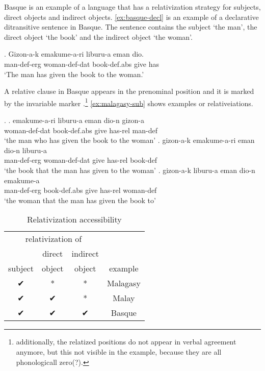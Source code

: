 Basque is an example of a language that has a relativization strategy for subjects, direct objects and indirect objects. \ref{ex:basque-decl} is an example of a declarative ditransitive sentence in Basque. The sentence contains the subject  `the man', the direct object  `the book' and the indirect object  `the woman'.

\exg. Gizon-a-k emakume-a-ri liburu-a eman dio.\\
 man-\ac{def}-\ac{erg} woman-\ac{def}-\ac{dat} book-\ac{def}.\ac{abs} give has\\
 `The man has given the book to the woman.' \label{ex:basque-decl}

A relative clause in Basque appears in the prenominal position and it is marked by the invariable marker .\footnote{
additionally, the relatized positions do not appear in verbal agreement anymore, but this not visible in the example, because they are all phonologicall zero(?).
}
\ref{ex:malagasy-sub} shows examples or relativeiations.




\ex.\label{ex:basque-rel}
\bg. emakume-a-ri liburu-a eman dio-n gizon-a\\
 woman-\ac{def}-\ac{dat} book-\ac{def}.\ac{abs} give has-\ac{rel} man-\ac{def}\\
 `the man who has given the book to the woman'\label{ex:basque-sub}
\bg. gizon-a-k emakume-a-ri eman dio-n liburu-a\\
 man-\ac{def}-\ac{erg} woman-\ac{def}-\ac{dat} give has-\ac{rel} book-\ac{def}\\
 `the book that the man has given to the woman'\label{ex:basque-do}
\bg. gizon-a-k liburu-a eman dio-n emakume-a\\
 man-\ac{def}-\ac{erg} book-\ac{def}.\ac{abs} give has-\ac{rel} woman-\ac{def}\\
 `the woman that the man has given the book to' \label{ex:basque-io}




 \begin{table}[H]
   \center
   \caption {Relativization accessibility}
     \begin{tabular}{cccc}
       \toprule
             \multicolumn{3}{c}{relativization of}
           & \\
       \cmidrule{1-3}
             & direct
             & indirect
           & \\
             subject
             & object
             & object
           & example \\
       \cmidrule{1-3} \cmidrule{4-4}
             ✔
             & *
             & *
           & Malagasy \\
             ✔
             & ✔
             & *
           & Malay \\
             ✔
             & ✔
             & ✔
           & Basque \\
       \bottomrule
     \end{tabular}
 \end{table}



